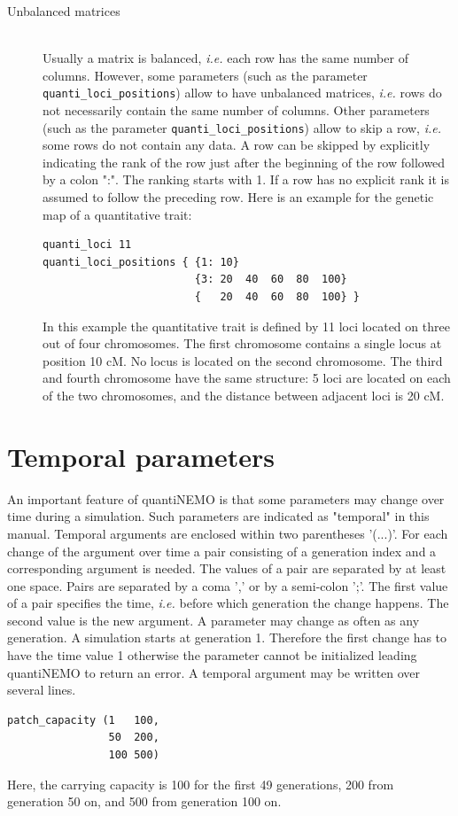 \documentclass[letterpaper,12pt,oneside]{book}
\begin{document}
\begin{description}
\begin{description}
\item[Unbalanced matrices]\hspace*{\fill}\\
Usually a matrix is balanced, \textit{i.e.} each row has the same number of columns. However, some parameters (such as the parameter \texttt{quanti\_loci\_positions}) allow to have unbalanced matrices, \textit{i.e.} rows do not necessarily contain the same number of columns. Other parameters (such as the parameter \texttt{quanti\_loci\_positions}) allow to skip a row, \textit{i.e.} some rows do not contain any data. A row can be skipped by explicitly indicating the rank of the row just after the beginning of the row followed by a colon ":". The ranking starts with 1. If a row has no explicit rank it is assumed to follow the preceding row. Here is an example for the genetic map of a quantitative trait:
\begin{lstlisting}[frame=single]
quanti_loci 11
quanti_loci_positions { {1: 10}
                        {3: 20  40  60  80  100}
                        {   20  40  60  80  100} }
\end{lstlisting} 
In this example the quantitative trait is defined by 11 loci located on three out of four chromosomes. The first chromosome contains a single locus at position 10 cM. No locus is located on the second chromosome. The third and fourth chromosome have the same structure: 5 loci are located on each of the two chromosomes, and the distance between adjacent loci is 20 cM.
\end{description}
\end{description}

\section{Temporal parameters}\label{tempParam}
An important feature of quantiNEMO is that some parameters may change over time during a simulation. Such parameters are indicated as "temporal" in this manual. Temporal arguments are enclosed within two parentheses '(...)'. For each change of the argument over time a pair consisting of a generation index and a corresponding argument is needed. The values of a pair are separated by at least one space. Pairs are separated by a coma ',' or by a semi-colon ';'. The first value of a pair specifies the time, \textit{i.e.} before which generation the change happens. The second value is the new argument. A parameter may change as often as any generation. A simulation starts at generation 1. Therefore the first change has to have the time value 1 otherwise the parameter cannot be initialized leading quantiNEMO to return an error. A temporal argument may be written over several lines.
\begin{lstlisting}[frame=single]
patch_capacity (1   100, 
                50  200, 
                100 500)
\end{lstlisting}
Here, the carrying capacity is 100 for the first 49 generations, 200 from generation 50 on, and 500 from generation 100 on. 
\end{document}
